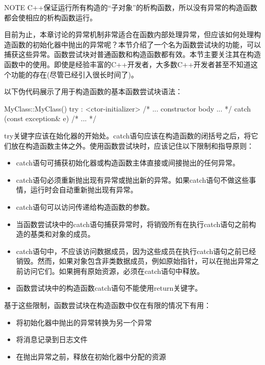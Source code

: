 \begin{myNotic}{NOTE}
C++保证运行所有构造的“子对象”的析构函数，所以没有异常的构造函数都会使相应的析构函数运行。
\end{myNotic}


目前为止，本章讨论的异常机制非常适合在函数内部处理异常，但应该如何处理构造函数的初始化器中抛出的异常呢？本节介绍了一个名为函数尝试块的功能，可以捕获这些异常。函数尝试块对普通函数和构造函数都有效。本节主要关注其在构造函数中的使用。即使是经验丰富的C++开发者，大多数C++开发者甚至不知道这个功能的存在(尽管已经引入很长时间了)。

以下伪代码展示了用于构造函数的基本函数尝试块语法：

\begin{cpp}
MyClass::MyClass()
try
: <ctor-initializer>
{
    /* ... constructor body ... */
}
catch (const exception& e)
{
    /* ... */
}
\end{cpp}

try关键字应该在始化器的开始处。catch语句应该在构造函数的闭括号之后，将它们放在构造函数主体之外。使用函数尝试块时，应该记住以下限制和指导原则：

\begin{itemize}
\item
catch语句可捕获初始化器或构造函数主体直接或间接抛出的任何异常。

\item
catch语句必须重新抛出现有异常或抛出新的异常。如果catch语句不做这些事情，运行时会自动重新抛出现有异常。

\item
catch语句可以访问传递给构造函数的参数。

\item
当函数尝试块中的catch语句捕获异常时，将销毁所有在执行catch语句之前构造的基类和对象的成员。

\item
catch语句中，不应该访问数据成员，因为这些成员在执行catch语句之前已经销毁。然而，如果对象包含非类数据成员，例如原始指针，可以在抛出异常之前访问它们。如果拥有原始资源，必须在catch语句中释放。

\item
函数尝试块中的构造函数catch语句不能使用return关键字。
\end{itemize}

基于这些限制，函数尝试块在构造函数中仅在有限的情况下有用：

\begin{itemize}
\item
将初始化器中抛出的异常转换为另一个异常

\item
将消息记录到日志文件

\item
在抛出异常之前，释放在初始化器中分配的资源
\end{itemize}

